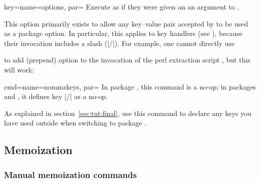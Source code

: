\documentclass[a4paper,11pt]{article}
\begin{document}
\begin{doc}{key={name=options, par=}}
  Execute  as if they were given an an argument to .

  This option primarily exists to allow any key--value pair accepted by
   to be used as a package option.  In particular, this applies
  to key handlers (see ), because their invocation includes a slash
  (|/|).  For example, one cannot directly use
  \begin{center}
  \end{center}
  to add (prepend) option  to the
  invocation of the perl extraction script , but
  this will work:
  \begin{center}
  \end{center}
\end{doc}

\begin{doc}{cmd={name=nommzkeys, par=}}
  In package , this command is a no-op; in packages
   and , it defines key
  |/| as a no-op.

  As explained in section~\ref{sec:tut:final}, use this command to declare any
   keys you have used outside  when switching
  to package .
\end{doc}


\subsection{Memoization}
\label{sec:ref:memoization}

\subsubsection{Manual memoization commands}
\label{sec:ref:memoization:manual}
\end{document}
